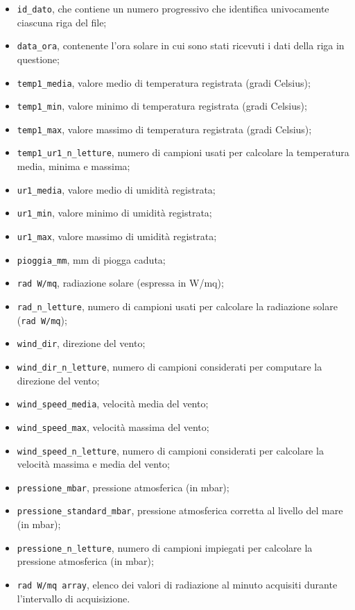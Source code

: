 \begin{itemize}
  \item \texttt{id\_dato}, che contiene un numero progressivo che identifica univocamente ciascuna riga del file;
  \item \texttt{data\_ora}, contenente l'ora solare in cui sono stati ricevuti i dati della riga in questione;
  \item \texttt{temp1\_media}, valore medio di temperatura registrata (gradi Celsius);
  \item \texttt{temp1\_min}, valore minimo di temperatura registrata (gradi Celsius);
  \item \texttt{temp1\_max}, valore massimo di temperatura registrata (gradi Celsius);
  \item \texttt{temp1\_ur1\_n\_letture}, numero di campioni usati per calcolare la temperatura media, minima e massima;
  \item \texttt{ur1\_media}, valore medio di umidità registrata;
  \item \texttt{ur1\_min}, valore minimo di umidità registrata;
  \item \texttt{ur1\_max}, valore massimo di umidità registrata;
  \item \texttt{pioggia\_mm}, mm di piogga caduta;
  \item \texttt{rad W/mq}, radiazione solare (espressa in W/mq);
  \item \texttt{rad\_n\_letture}, numero di campioni usati per calcolare la radiazione solare (\texttt{rad W/mq});
  \item \texttt{wind\_dir}, direzione del vento;
  \item \texttt{wind\_dir\_n\_letture}, numero di campioni considerati per computare la direzione del vento;
  \item \texttt{wind\_speed\_media}, velocità media del vento; 
  \item \texttt{wind\_speed\_max}, velocità massima del vento;
  \item \texttt{wind\_speed\_n\_letture}, numero di campioni considerati per calcolare la velocità massima e media del vento;
  \item \texttt{pressione\_mbar}, pressione atmosferica (in mbar);
  \item \texttt{pressione\_standard\_mbar}, pressione atmosferica corretta al livello del mare (in mbar);
  \item \texttt{pressione\_n\_letture}, numero di campioni impiegati per calcolare la pressione atmosferica (in mbar);
  \item \texttt{rad W/mq array}, elenco dei valori di radiazione al minuto acquisiti durante l’intervallo di acquisizione.
\end{itemize}

